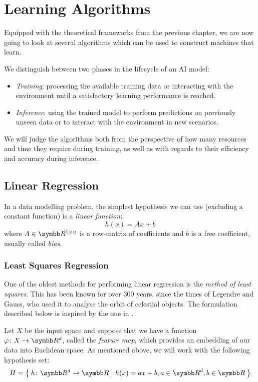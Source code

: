 \chapter{Learning Algorithms}

Equipped with the theoretical frameworks from the previous chapter, we are now going to look at several algorithms which can be used to construct machines that learn.

We distinguish between two phases in the lifecycle of an AI model:
\begin{itemize}
    \item \emph{Training}: processing the available training data or interacting with the environment until a satisfactory learning performance is reached.
    \item \emph{Inference}: using the trained model to perform predictions on previously unseen data or to interact with the environment in new scenarios.
\end{itemize}
We will judge the algorithms both from the perspective of how many resources and time they require during training, as well as with regards to their efficiency and accuracy during inference.

\section{Linear Regression}

In a data modelling problem, the simplest hypothesis we can use (excluding a constant function) is a \emph{linear function}:
\[
    h(x) = A x + b
\]
    where \(A \in \reals^{1 \times n}\) is a row-matrix of coefficients and \(b\) is a free coefficient, usually called \emph{bias}.

\subsection{Least Squares Regression}

One of the oldest methods for performing linear regression is the \emph{method of least squares}. This has been known for over 300 years, since the times of Legendre and Gauss, who used it to analyse the orbit of celestial objects. The formulation described below is inspired by the one in \cite{Mohri2018}.

Let \(X\) be the input space and suppose that we have a function \(\varphi \colon X \to \reals^d\), called the \emph{feature map}, which provides an embedding of our data into Euclidean space. As mentioned above, we will work with the following hypothesis set:
\[
    H = \Set{ h \colon \reals^d \to \reals | h(x) = a x + b, a \in \reals^d, b \in \reals }  
\]

